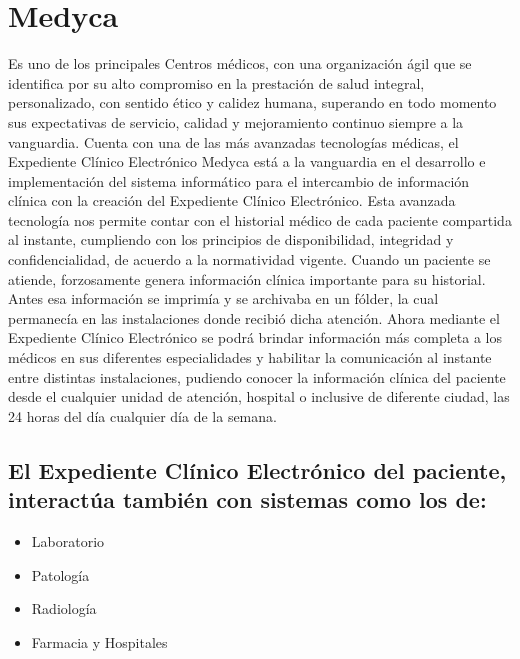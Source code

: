 \section{Medyca}
Es uno de los principales Centros médicos, con una organización ágil que se identifica por su alto compromiso en la prestación de salud integral, personalizado, con sentido ético y calidez humana, superando en todo momento sus expectativas de servicio, calidad y mejoramiento continuo siempre a la vanguardia. \cite{mediesel}
Cuenta con una de las más avanzadas tecnologías médicas, el Expediente Clínico Electrónico Medyca está a la vanguardia en el desarrollo e implementación del sistema informático para el intercambio de información clínica con la creación del Expediente Clínico Electrónico. Esta avanzada tecnología nos permite contar con el historial médico de cada paciente compartida al instante, cumpliendo con los principios de disponibilidad, integridad y confidencialidad, de acuerdo a la normatividad vigente. \cite{mediesel}
Cuando un paciente se atiende, forzosamente genera información clínica importante para su historial. Antes esa información se imprimía y se archivaba en un fólder, la cual permanecía en las instalaciones donde recibió dicha atención.
Ahora mediante el Expediente Clínico Electrónico se podrá brindar información más completa a los médicos en sus diferentes especialidades y habilitar la comunicación al instante entre distintas instalaciones, pudiendo conocer la información clínica del paciente desde el cualquier unidad de atención, hospital o inclusive de diferente ciudad, las 24 horas del día cualquier día de la semana. \cite{mediesel}

\subsection{El Expediente Clínico Electrónico del paciente, interactúa también con sistemas como los de:}
\begin{itemize}
  \item Laboratorio
  \item Patología
  \item Radiología
  \item Farmacia y Hospitales
\end{itemize}

